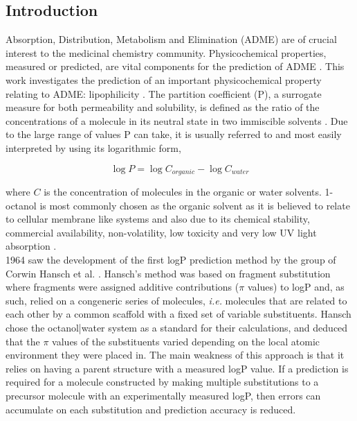 \documentclass[10pt]{bmc_article}
\newenvironment{bmcformat}{\begin{raggedright}\baselineskip20pt\sloppy\setboolean{publ}{false}}{\end{raggedright}\baselineskip20pt\sloppy}
\begin{document}
\begin{bmcformat}

\section*{Introduction}
Absorption, Distribution, Metabolism and Elimination (ADME) are of crucial interest to the medicinal chemistry community. Physicochemical properties, measured or predicted, are vital components for the prediction of ADME \cite{van_de_waterbeemd_admet_2003}. This work investigates the prediction of an important physicochemical property relating to ADME: lipophilicity \cite{lipinski_experimental_1997, arnott_influence_2012}. The partition coefficient (P), a surrogate measure for both permeability and solubility, is defined as the ratio of the concentrations of a molecule in its neutral state in two immiscible solvents \cite{leo_partition_1971}. Due to the large range of values P can take, it is usually referred to and most easily interpreted by using its logarithmic form,

\begin{equation}
  \label{eq:logP}
  \log{P} = \log{C_{organic}} - \log{C_{water}} 
\end{equation}

where $C$ is the concentration of molecules in the organic or water solvents. 1-octanol is most commonly chosen as the organic solvent as it is believed to relate to cellular membrane like systems and also due to its chemical stability, commercial availability, non-volatility, low toxicity and very low UV light absorption \cite{smith_selection_1975}.
\mbox{}\\

1964 saw the development of the first logP prediction method by the group of Corwin Hansch et al. \cite{fujita_new_1964}. Hansch's method was based on fragment substitution where fragments were assigned additive contributions ($\pi$ values) to logP and, as such, relied on a congeneric series of molecules, \textit{i.e.} molecules that are related to each other by a common scaffold with a fixed set of variable substituents. Hansch chose the octanol|water system as a standard for their calculations, and deduced that the $\pi$ values of the substituents varied depending on the local atomic environment they were placed in. The main weakness of this approach is that it relies on having a parent structure with a measured logP value. If a prediction is required for a molecule constructed by making multiple substitutions to a precursor molecule with an experimentally measured logP, then errors can accumulate on each substitution and prediction accuracy is reduced.


\end{bmcformat}
\end{document}
